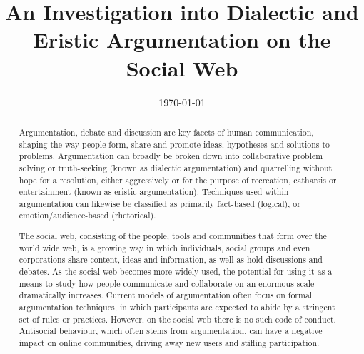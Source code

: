 \documentclass[twoside]{ecsthesis}      %
\begin{document}
\frontmatter
\title      {An Investigation into Dialectic and Eristic Argumentation on the Social Web}
\addresses  {\groupname\\\deptname\\\univname}
\date       {\today}
\subject    {}
\keywords   {}
\maketitle
\begin{abstract}
Argumentation, debate and discussion are key facets of human communication, shaping the way people form, share and promote ideas, hypotheses and solutions to problems. Argumentation can broadly be broken down into collaborative problem solving or truth-seeking (known as dialectic argumentation) and quarrelling without hope for a resolution, either aggressively or for the purpose of recreation, catharsis or entertainment (known as eristic argumentation). Techniques used within argumentation can likewise be classified as primarily fact-based (logical), or emotion/audience-based (rhetorical).

The social web, consisting of the people, tools and communities that form over the world wide web, is a growing way in which individuals, social groups and even corporations share content, ideas and information, as well as hold discussions and debates. As the social web becomes more widely used, the potential for using it as a means to study how people communicate and collaborate on an enormous scale dramatically increases. Current models of argumentation often focus on formal argumentation techniques, in which participants are expected to abide by a stringent set of rules or practices. However, on the social web there is no such code of conduct. Antisocial behaviour, which often stems from argumentation, can have a negative impact on online communities, driving away new users and stifling participation.


\end{abstract}
\end{document}
